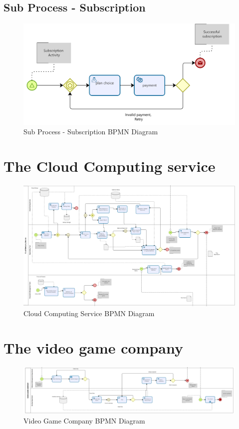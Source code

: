\documentclass[a4paper,12pt]{report}
\begin{document}
\subsection{Sub Process - Subscription }
\begin{figure}[H]
 \centering
\includegraphics[scale=0.35]{subscription_BPMN}
\caption{Sub Process - Subscription BPMN Diagram}
\label{Subscription BPMN}
\end{figure} 

\section{The Cloud Computing service }
\begin{figure}[H]
 \centering
\includegraphics[scale=0.15]{cloud_BPMN}
\caption{Cloud Computing Service BPMN Diagram}
\label{Cloud BPMN}

\end{figure}



\section{The video game company  }
\begin{figure}[H]
 \centering
\includegraphics[scale=0.15]{videogame_BPMN}
\caption{Video Game Company BPMN Diagram}
\label{VideoGame BPMN}
\end{figure} 
\end{document}
